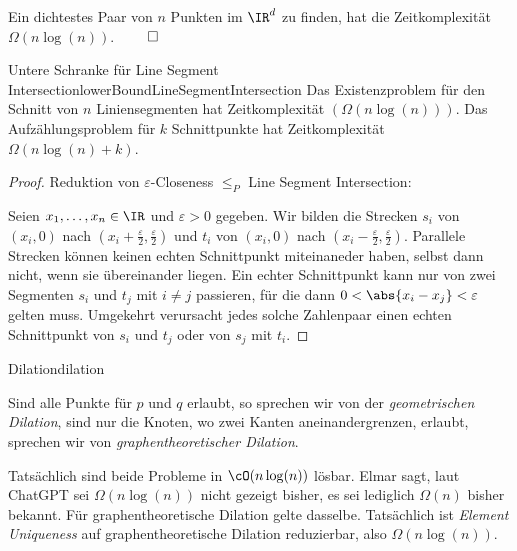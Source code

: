 \documentclass[language=ngerman,algolist,acrolist]{TemplateLecture}
\begin{document}
\begin{cor}
    Ein dichtestes Paar von $n$ Punkten im $\IR^d$ zu finden, hat die Zeitkomplexität $\Omega(n \log(n))$. \hfill $\qed$
\end{cor}


\begin{lem}{Untere Schranke für Line Segment Intersection}{lowerBoundLineSegmentIntersection}
    Das Existenzproblem für den Schnitt von $n$ Liniensegmenten hat Zeitkomplexität $(\Omega(n \log(n)))$. Das Aufzählungsproblem für $k$ Schnittpunkte hat Zeitkomplexität $\Omega(n \log(n) + k)$.
\end{lem}

\begin{proof}
    Reduktion von $\varepsilon$-Closeness $\leq_P$ Line Segment Intersection: 
    
    Seien $x_1, \ldots, x_n \in \IR$ und $\varepsilon > 0$ gegeben. Wir bilden die Strecken $s_i$ von $(x_i, 0)$ nach $(x_i + \frac{\varepsilon}{2}, \frac{\varepsilon}{2})$ und $t_i$ von $(x_i, 0)$ nach $(x_i - \frac{\varepsilon}{2}, \frac{\varepsilon}{2})$. Parallele Strecken können keinen echten Schnittpunkt miteinaneder haben, selbst dann nicht, wenn sie übereinander liegen. Ein echter Schnittpunkt kann nur von zwei Segmenten $s_i$ und $t_j$ mit $i \neq j$ passieren, für die dann $0 < \abs{x_i - x_j} < \varepsilon$ gelten muss. Umgekehrt verursacht jedes solche Zahlenpaar einen echten Schnittpunkt von $s_i$ und $t_j$ oder von $s_j$ mit $t_i$.
\end{proof}



\begin{prob}{Dilation}{dilation}
\end{prob}
Sind alle Punkte für $p$ und $q$ erlaubt, so sprechen wir von der \emph{geometrischen Dilation}, sind nur die Knoten, wo zwei Kanten aneinandergrenzen, erlaubt, sprechen wir von \emph{graphentheoretischer Dilation}.

Tatsächlich sind beide Probleme in $\cO(n \log(n))$ lösbar. Elmar sagt, laut ChatGPT sei $\Omega(n \log(n))$ nicht gezeigt bisher, es sei lediglich $\Omega(n)$ bisher bekannt. Für graphentheoretische Dilation gelte dasselbe. Tatsächlich ist \emph{Element Uniqueness} auf graphentheoretische Dilation reduzierbar, also $\Omega(n \log(n))$.
\end{document}
